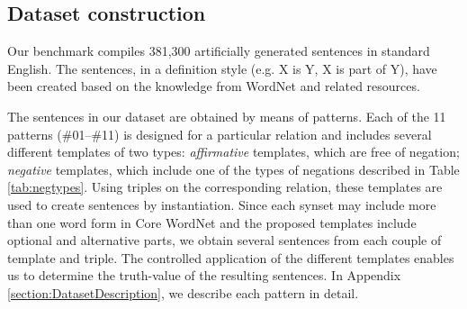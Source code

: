 \documentclass[11pt]{article}
\newcommand{\WORDNET}{WordNet}
\begin{document}
\begin{table}[ht] \centering

\caption{Distribution of sentences by pattern.}
\label{tab:Dataset}
\end{table} 


\subsection{Dataset construction} \label{subsection:DatasetConstruction}

Our benchmark compiles 381,300 artificially generated sentences in standard English. The sentences, in a definition style (e.g. X is Y, X is part of Y), have been created based on the knowledge from \WORDNET{} and related resources. 

The sentences in our dataset are obtained by means of patterns. Each of the 11 patterns (\#01--\#11) is designed for a particular relation and includes several different templates of two types: {\it affirmative} templates, which are free of negation; {\it negative} templates, which include one of the types of negations described in Table \ref{tab:negtypes}. Using triples on the corresponding relation, these templates are used to create sentences by instantiation. Since each synset may include more than one word form in Core \WORDNET{} and the proposed templates include optional and alternative parts, we obtain several sentences from each couple of template and triple. The controlled application of the different templates enables us to determine the truth-value of the resulting sentences. In Appendix \ref{section:DatasetDescription}, we describe each pattern in detail.
\end{document}
